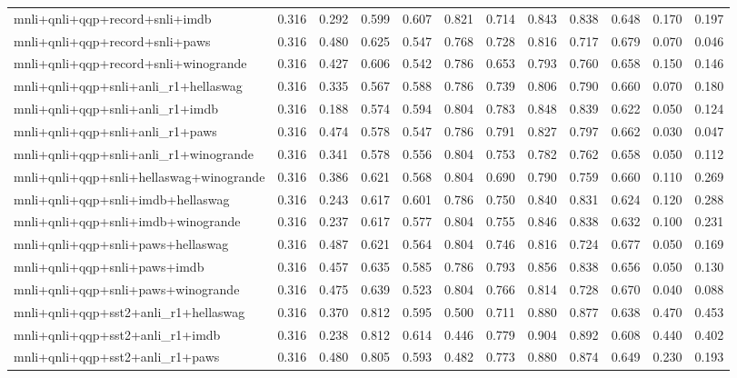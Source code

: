 \begin{table}[t]
\begin{tabular}{lrrrrrrrrrrr}
    mnli+qnli+qqp+record+snli+imdb & 0.316 & 0.292 & 0.599 & 0.607 & 0.821 & 0.714 & 0.843 & 0.838 & 0.648 & 0.170 & 0.197 \\
    mnli+qnli+qqp+record+snli+paws & 0.316 & 0.480 & 0.625 & 0.547 & 0.768 & 0.728 & 0.816 & 0.717 & 0.679 & 0.070 & 0.046 \\
    mnli+qnli+qqp+record+snli+winogrande & 0.316 & 0.427 & 0.606 & 0.542 & 0.786 & 0.653 & 0.793 & 0.760 & 0.658 & 0.150 & 0.146 \\
    mnli+qnli+qqp+snli+anli\_r1+hellaswag & 0.316 & 0.335 & 0.567 & 0.588 & 0.786 & 0.739 & 0.806 & 0.790 & 0.660 & 0.070 & 0.180 \\
    mnli+qnli+qqp+snli+anli\_r1+imdb & 0.316 & 0.188 & 0.574 & 0.594 & 0.804 & 0.783 & 0.848 & 0.839 & 0.622 & 0.050 & 0.124 \\
    mnli+qnli+qqp+snli+anli\_r1+paws & 0.316 & 0.474 & 0.578 & 0.547 & 0.786 & 0.791 & 0.827 & 0.797 & 0.662 & 0.030 & 0.047 \\
    mnli+qnli+qqp+snli+anli\_r1+winogrande & 0.316 & 0.341 & 0.578 & 0.556 & 0.804 & 0.753 & 0.782 & 0.762 & 0.658 & 0.050 & 0.112 \\
    mnli+qnli+qqp+snli+hellaswag+winogrande & 0.316 & 0.386 & 0.621 & 0.568 & 0.804 & 0.690 & 0.790 & 0.759 & 0.660 & 0.110 & 0.269 \\
    mnli+qnli+qqp+snli+imdb+hellaswag & 0.316 & 0.243 & 0.617 & 0.601 & 0.786 & 0.750 & 0.840 & 0.831 & 0.624 & 0.120 & 0.288 \\
    mnli+qnli+qqp+snli+imdb+winogrande & 0.316 & 0.237 & 0.617 & 0.577 & 0.804 & 0.755 & 0.846 & 0.838 & 0.632 & 0.100 & 0.231 \\
    mnli+qnli+qqp+snli+paws+hellaswag & 0.316 & 0.487 & 0.621 & 0.564 & 0.804 & 0.746 & 0.816 & 0.724 & 0.677 & 0.050 & 0.169 \\
    mnli+qnli+qqp+snli+paws+imdb & 0.316 & 0.457 & 0.635 & 0.585 & 0.786 & 0.793 & 0.856 & 0.838 & 0.656 & 0.050 & 0.130 \\
    mnli+qnli+qqp+snli+paws+winogrande & 0.316 & 0.475 & 0.639 & 0.523 & 0.804 & 0.766 & 0.814 & 0.728 & 0.670 & 0.040 & 0.088 \\
    mnli+qnli+qqp+sst2+anli\_r1+hellaswag & 0.316 & 0.370 & 0.812 & 0.595 & 0.500 & 0.711 & 0.880 & 0.877 & 0.638 & 0.470 & 0.453 \\
    mnli+qnli+qqp+sst2+anli\_r1+imdb & 0.316 & 0.238 & 0.812 & 0.614 & 0.446 & 0.779 & 0.904 & 0.892 & 0.608 & 0.440 & 0.402 \\
    mnli+qnli+qqp+sst2+anli\_r1+paws & 0.316 & 0.480 & 0.805 & 0.593 & 0.482 & 0.773 & 0.880 & 0.874 & 0.649 & 0.230 & 0.193 \\

\end{tabular}
\end{table}
